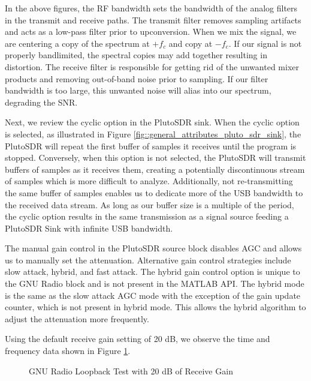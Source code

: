 \documentclass{article}
\begin{document}
In the above figures, the RF bandwidth sets the bandwidth of the analog filters in the transmit and receive paths. The transmit filter removes sampling artifacts and acts as a low-pass filter prior to upconversion. When we mix the signal, we are centering a copy of the spectrum at $+f_c$ and copy at $-f_c$. If our signal is not properly bandlimited, the spectral copies may add together resulting in distortion. The receive filter is responsible for getting rid of the unwanted mixer products and removing out-of-band noise prior to sampling. If our filter bandwidth is too large, this unwanted noise will alias into our spectrum, degrading the SNR. 

Next, we review the cyclic option in the PlutoSDR sink. When the cyclic option is selected, as illustrated in Figure \ref{fig::general_attributes_pluto_sdr_sink}, the PlutoSDR will repeat the first buffer of samples it receives until the program is stopped. Conversely, when this option is not selected, the PlutoSDR will transmit buffers of samples as it receives them, creating a potentially discontinuous stream of samples which is more difficult to analyze. Additionally, not re-transmitting the same buffer of samples enables us to dedicate more of the USB bandwidth to the received data stream. As long as our buffer size is a multiple of the period, the cyclic option results in the same transmission as a signal source feeding a PlutoSDR Sink with infinite USB bandwidth.

The manual gain control in the PlutoSDR source block disables AGC and allows us to manually set the attenuation. Alternative gain control strategies include slow attack, hybrid, and fast attack. The hybrid gain control option is unique to the GNU Radio block and is not present in the MATLAB API. The hybrid mode is the same as the slow attack AGC mode with the exception of the gain update counter, which is not present in hybrid mode. This allows the hybrid algorithm to adjust the attenuation more frequently.

Using the default receive gain setting of 20 dB, we observe the time and frequency data shown in Figure \ref{fig::gnu_radio_loopback_baseline}.

\begin{figure}[H]
	\centerline{}
	\caption{GNU Radio Loopback Test with 20 dB of Receive Gain}
	\label{fig::gnu_radio_loopback_baseline}
\end{figure}
\end{document}
